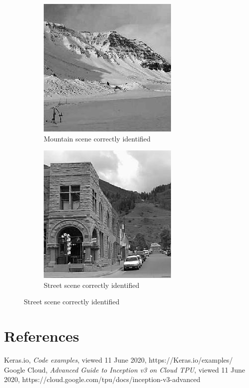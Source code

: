 \begin{homeworkProblem}
\begin{figure}[H]
\begin{subfigure}{0.5\textwidth}
    \end{subfigure}%
    \begin{subfigure}{0.5\textwidth}
      \centering
      \caption{Mountain scene correctly identified}
      \includegraphics[width=.5\linewidth]{./images/incept/mountain_match_1.jpg}
    \end{subfigure}
    \begin{subfigure}{0.5\textwidth}
      \centering
      \caption{Street scene correctly identified}
      \includegraphics[width=.5\linewidth]{./images/incept/street_match_1.jpg}
    \end{subfigure}%
  \end{figure}

\end{homeworkProblem}



\section{References}
  Keras.io, \emph{Code examples}, viewed 11 June 2020,
  https://Keras.io/examples/ \\
  Google Cloud, \emph{Advanced Guide to Inception v3 on Cloud TPU}, viewed 11 June 2020, https://cloud.google.com/tpu/docs/inception-v3-advanced



